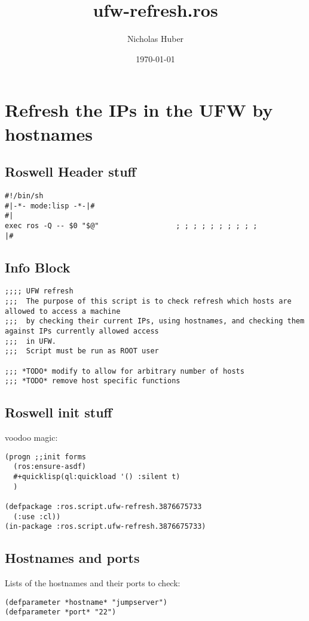 \documentclass[11pt]{article}
\author{Nicholas Huber}
\date{\today}
\title{ufw-refresh.ros}
\begin{document}
\maketitle
\tableofcontents


\section{Refresh the IPs in the UFW by hostnames}
\label{sec:orgdbe2b8e}
\subsection{Roswell Header stuff}
\label{sec:org5baac55}
\begin{verbatim}
#!/bin/sh
#|-*- mode:lisp -*-|#
#|
exec ros -Q -- $0 "$@"                  ; ; ; ; ; ; ; ; ; ;
|#

\end{verbatim}

\subsection{Info Block}
\label{sec:org779ba16}
\begin{verbatim}
;;;; UFW refresh
;;;  The purpose of this script is to check refresh which hosts are allowed to access a machine
;;;  by checking their current IPs, using hostnames, and checking them against IPs currently allowed access
;;;  in UFW.
;;;  Script must be run as ROOT user

;;; *TODO* modify to allow for arbitrary number of hosts
;;; *TODO* remove host specific functions
\end{verbatim}

\subsection{Roswell init stuff}
\label{sec:orge205fee}
voodoo magic:

\begin{verbatim}
(progn ;;init forms
  (ros:ensure-asdf)
  #+quicklisp(ql:quickload '() :silent t)
  )

(defpackage :ros.script.ufw-refresh.3876675733
  (:use :cl))
(in-package :ros.script.ufw-refresh.3876675733)
\end{verbatim}

\subsection{Hostnames and ports}
\label{sec:orgb0aca76}
Lists of the hostnames and their ports to check:
\begin{verbatim}
(defparameter *hostname* "jumpserver")
(defparameter *port* "22")
\end{verbatim}
\end{document}
